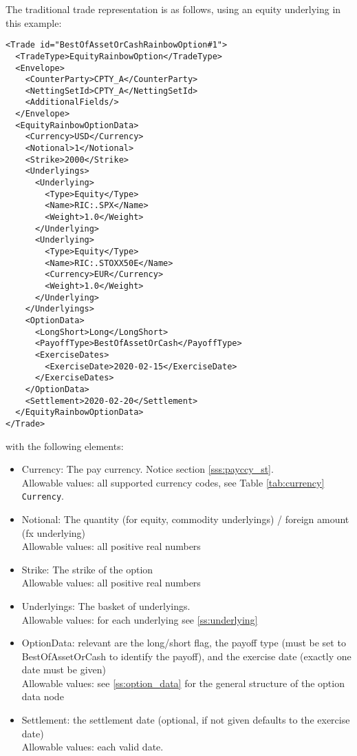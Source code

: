 The traditional trade representation is as follows, using an equity underlying in this example:

\begin{verbatim}
<Trade id="BestOfAssetOrCashRainbowOption#1">
  <TradeType>EquityRainbowOption</TradeType>
  <Envelope>
    <CounterParty>CPTY_A</CounterParty>
    <NettingSetId>CPTY_A</NettingSetId>
    <AdditionalFields/>
  </Envelope>
  <EquityRainbowOptionData>
    <Currency>USD</Currency>
    <Notional>1</Notional>
    <Strike>2000</Strike>
    <Underlyings>
      <Underlying>
        <Type>Equity</Type>
        <Name>RIC:.SPX</Name>
        <Weight>1.0</Weight>
      </Underlying>
      <Underlying>
        <Type>Equity</Type>
        <Name>RIC:.STOXX50E</Name>
        <Currency>EUR</Currency>
        <Weight>1.0</Weight>
      </Underlying>
    </Underlyings>
    <OptionData>
      <LongShort>Long</LongShort>
      <PayoffType>BestOfAssetOrCash</PayoffType>
      <ExerciseDates>
        <ExerciseDate>2020-02-15</ExerciseDate>
      </ExerciseDates>
    </OptionData>
    <Settlement>2020-02-20</Settlement>
  </EquityRainbowOptionData>
</Trade>
\end{verbatim}

with the following elements:

\begin{itemize}
\item Currency: The pay currency. Notice section \ref{sss:payccy_st}. \\
  Allowable values: all supported currency codes, see Table \ref{tab:currency} \lstinline!Currency!.
\item Notional: The quantity (for equity, commodity underlyings) / foreign amount (fx underlying) \\
  Allowable values: all positive real numbers
\item Strike: The strike of the option \\
  Allowable values: all positive real numbers
\item Underlyings: The basket of underlyings. \\
  Allowable values: for each underlying see \ref{ss:underlying}
\item OptionData: relevant are the long/short flag, the payoff type (must be set to BestOfAssetOrCash to
  identify the payoff), and the exercise date (exactly one date must be given) \\
  Allowable values: see \ref{ss:option_data} for the general structure of the option data node
\item Settlement: the settlement date (optional, if not given defaults to the exercise date) \\
  Allowable values: each valid date.
\end{itemize}

